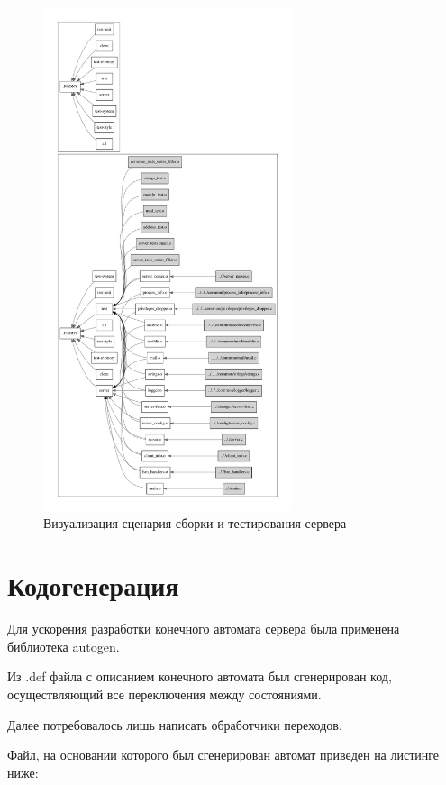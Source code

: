 \documentclass[a4paper,12pt]{report}
\begin{document}
\begin{figure}[H]
	\centering
	\includegraphics[width=0.65\textwidth]{include/server_make.pdf}
	\caption{Визуализация сценария сборки и тестирования сервера}
	\label{fig:make1}
\end{figure}

\section{Кодогенерация}
Для ускорения разработки конечного автомата сервера была применена библиотека autogen. 

Из .def файла с описанием конечного автомата был сгенерирован код, осуществляющий все переключения между состояниями. 

Далее потребовалось лишь написать обработчики переходов. 

Файл, на основании которого был сгенерирован автомат приведен на листинге ниже:

\end{document}
